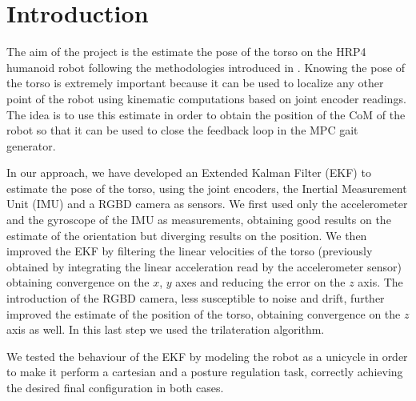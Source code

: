 \documentclass[a4paper]{article}
\begin{document}
\tableofcontents
\newpage



\section{Introduction}

The aim of the project is the estimate the pose of the torso on the HRP4
humanoid robot following the methodologies introduced in
\cite{DBLP:journals/arobots/OrioloPRV16}. Knowing the pose of the torso is
extremely important because it can be used to localize any other point of
the robot using kinematic computations based on joint encoder readings.
The idea is to use this estimate in order to obtain the position of the CoM %
of the robot so that it can be used to close the feedback loop in the
MPC gait generator.

In our approach, we have developed an Extended Kalman Filter (EKF) to estimate
the pose of the torso, using
the joint encoders, the Inertial Measurement Unit (IMU) and a RGBD camera
as sensors. We first used only the accelerometer and the gyroscope of the IMU
as measurements, obtaining good results on the estimate of the orientation but
diverging results on the position. We then improved the EKF by filtering the
linear velocities of the torso (previously obtained by integrating the linear
acceleration read by the accelerometer sensor) obtaining convergence on the
$x$, $y$ axes and reducing the error on the $z$ axis. The introduction of the
RGBD camera, less susceptible to noise and drift, further improved the
estimate of the position of the torso, obtaining convergence on the $z$
axis as well. In this last step we used the trilateration algorithm.

We tested the behaviour of the EKF by modeling the robot as a unicycle
in order to make it perform a cartesian and a posture regulation task,
correctly achieving the desired final configuration in both cases.
\end{document}
